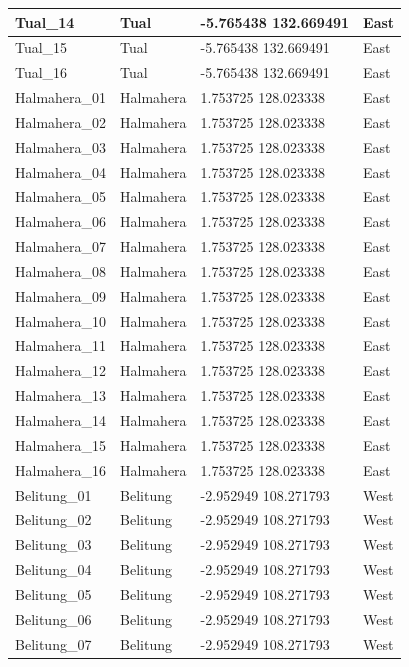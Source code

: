 \documentclass[
]{article}
\begin{document}
\begin{table}
\begin{tabular}{l|l|l|l}
\hline
Tual\_14 & Tual & -5.765438 132.669491 & East\\
\hline
Tual\_15 & Tual & -5.765438 132.669491 & East\\
\hline
Tual\_16 & Tual & -5.765438 132.669491 & East\\
\hline
Halmahera\_01 & Halmahera & 1.753725 128.023338 & East\\
\hline
Halmahera\_02 & Halmahera & 1.753725 128.023338 & East\\
\hline
Halmahera\_03 & Halmahera & 1.753725 128.023338 & East\\
\hline
Halmahera\_04 & Halmahera & 1.753725 128.023338 & East\\
\hline
Halmahera\_05 & Halmahera & 1.753725 128.023338 & East\\
\hline
Halmahera\_06 & Halmahera & 1.753725 128.023338 & East\\
\hline
Halmahera\_07 & Halmahera & 1.753725 128.023338 & East\\
\hline
Halmahera\_08 & Halmahera & 1.753725 128.023338 & East\\
\hline
Halmahera\_09 & Halmahera & 1.753725 128.023338 & East\\
\hline
Halmahera\_10 & Halmahera & 1.753725 128.023338 & East\\
\hline
Halmahera\_11 & Halmahera & 1.753725 128.023338 & East\\
\hline
Halmahera\_12 & Halmahera & 1.753725 128.023338 & East\\
\hline
Halmahera\_13 & Halmahera & 1.753725 128.023338 & East\\
\hline
Halmahera\_14 & Halmahera & 1.753725 128.023338 & East\\
\hline
Halmahera\_15 & Halmahera & 1.753725 128.023338 & East\\
\hline
Halmahera\_16 & Halmahera & 1.753725 128.023338 & East\\
\hline
Belitung\_01 & Belitung & -2.952949 108.271793 & West\\
\hline
Belitung\_02 & Belitung & -2.952949 108.271793 & West\\
\hline
Belitung\_03 & Belitung & -2.952949 108.271793 & West\\
\hline
Belitung\_04 & Belitung & -2.952949 108.271793 & West\\
\hline
Belitung\_05 & Belitung & -2.952949 108.271793 & West\\
\hline
Belitung\_06 & Belitung & -2.952949 108.271793 & West\\
\hline
Belitung\_07 & Belitung & -2.952949 108.271793 & West\\

\end{tabular}
\end{table}
\end{document}
